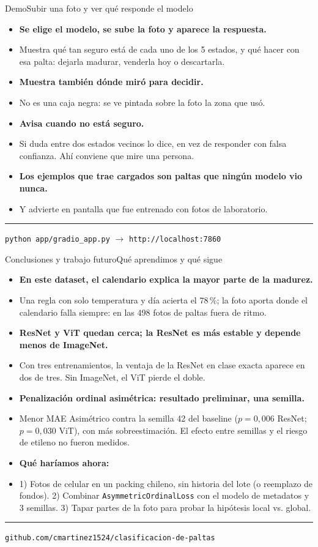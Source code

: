 \documentclass[aspectratio=169,11pt,table]{beamer}
\newcommand{\cierre}[1]{%
  \vfill
  {\color{verdecla}\rule{2.5pt}{0.9em}}\hspace{0.4em}%
  {\footnotesize\color{grisSuave}#1}%
}
\begin{document}
\begin{frame}{Demo}{Subir una foto y ver qué responde el modelo}
{\small
\setlength{\itemsep}{0.35em}
\begin{itemize}
  \item {\bfseries Se elige el modelo, se sube la foto y aparece la respuesta.}
  \item Muestra qué tan seguro está de cada uno de los 5 estados, y qué hacer con esa palta: dejarla madurar, venderla hoy o descartarla.
  \item {\bfseries Muestra también dónde miró para decidir.}
  \item No es una caja negra: se ve pintada sobre la foto la zona que usó.
  \item {\bfseries Avisa cuando no está seguro.}
  \item Si duda entre dos estados vecinos lo dice, en vez de responder con falsa confianza. Ahí conviene que mire una persona.
  \item {\bfseries Los ejemplos que trae cargados son paltas que ningún modelo vio nunca.}
  \item Y advierte en pantalla que fue entrenado con fotos de laboratorio.
\end{itemize}
}
\cierre{\texttt{python app/gradio\_app.py} $\rightarrow$ \texttt{http://localhost:7860}}
\end{frame}

\begin{frame}{Conclusiones y trabajo futuro}{Qué aprendimos y qué sigue}
{\scriptsize
\setlength{\itemsep}{0.22em}
\begin{itemize}
  \item {\bfseries En este dataset, el calendario explica la mayor parte de la madurez.}
  \item Una regla con solo temperatura y día acierta el 78\,\%; la foto aporta donde el calendario falla siempre: en las 498 fotos de paltas fuera de ritmo.
  \item {\bfseries ResNet y ViT quedan cerca; la ResNet es más estable y depende menos de ImageNet.}
  \item Con tres entrenamientos, la ventaja de la ResNet en clase exacta aparece en dos de tres. Sin ImageNet, el ViT pierde el doble.
  \item {\bfseries Penalización ordinal asimétrica: resultado preliminar, una semilla.}
  \item Menor MAE Asimétrico contra la semilla 42 del baseline ($p=0{,}006$ ResNet; $p=0{,}030$ ViT), con más sobreestimación. El efecto entre semillas y el riesgo de etileno no fueron medidos.
  \item {\bfseries Qué haríamos ahora:}
  \item 1) Fotos de celular en un packing chileno, sin historia del lote (o reemplazo de fondos). 2) Combinar \texttt{AsymmetricOrdinalLoss} con el modelo de metadatos y 3 semillas. 3) Tapar partes de la foto para probar la hipótesis local vs. global.
\end{itemize}
}
\cierre{\texttt{github.com/cmartinez1524/clasificacion-de-paltas}}
\end{frame}
\end{document}
